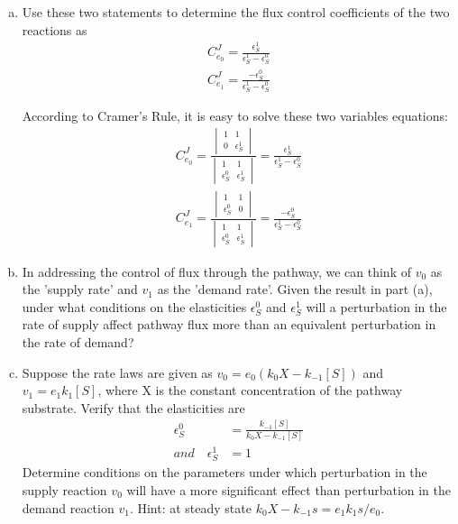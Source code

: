 \documentclass[paper=a4, fontsize=11pt]{scrartcl} %
\numberwithin{equation}{section} %
\numberwithin{figure}{section} %
\numberwithin{table}{section} %
\begin{document}
	\begin{enumerate}[a)]
		\item Use these two statements to determine the flux control coefficients of the two reactions as
		\begin{align*}
			C_{e_0}^J=\frac{\epsilon_S^1}{\epsilon_S^1-\epsilon_S^0}\\
			C_{e_1}^J=\frac{-\epsilon_S^0}{\epsilon_S^1-\epsilon_S^0}
		\end{align*}

		According to Cramer's Rule, it is easy to solve these two variables equations:
		\begin{align*}
			C_{e_0}^J=\frac{
				\begin{vmatrix}
					1 & 1  \\
   					0 & \epsilon_S^1
				\end{vmatrix}
			}{
				\begin{vmatrix}
					1 & 1  \\
   					\epsilon_S^0 & \epsilon_S^1
				\end{vmatrix}
			}=\frac{\epsilon_S^1}{\epsilon_S^1-\epsilon_S^0}\\
			C_{e_1}^J=\frac{
				\begin{vmatrix}
					1 & 1  \\
   					\epsilon_S^0 & 0
				\end{vmatrix}
			}{
				\begin{vmatrix}
					1 & 1  \\
   					\epsilon_S^0 & \epsilon_S^1
				\end{vmatrix}
			}=\frac{-\epsilon_S^0}{\epsilon_S^1-\epsilon_S^0}
		\end{align*}

		\item In addressing the control of flux through the pathway, we can think of $v_0$ as the 'supply rate' and $v_1$ as the 'demand rate'. Given the result in part (a), under what conditions on the elasticities $\epsilon_S^0$ and $\epsilon_S^1$ will a perturbation in the rate of supply affect pathway flux more than an equivalent perturbation in the rate of demand?



		\item Suppose the rate laws are given as $v_0 = e_0(k_0X - k_{-1}[S])$ and $v_1 = e_1k_1[S]$, where X is the constant concentration of the pathway substrate. Verify that the elasticities are
		\begin{align*}
			\epsilon_S^0 &= \frac{k_{-1}[S]}{k_0X-k_{-1}[S]}\\
			and \quad \epsilon_S^1 &= 1
		\end{align*}
		Determine conditions on the parameters under which perturbation in the supply reaction $v_0$ will have a more significant effect than perturbation in the demand reaction $v_1$. Hint: at steady state $k_0X-k_{-1}s = e_1k_1s/e_0$.



	\end{enumerate}
\end{document}
